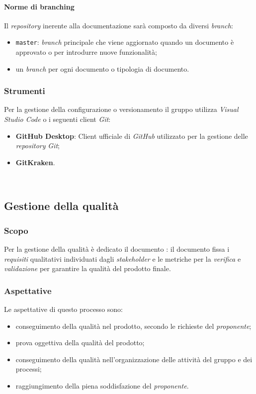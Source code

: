 		\paragraph{Norme di branching}
		\aCapo{}  
			Il \emph{repository} inerente alla documentazione sarà composto da diversi \textit{branch}:
			\begin{itemize}
				\item \verb#master#: \emph{branch} principale che viene aggiornato quando un documento è approvato o per introdurre nuove funzionalità; 
				\item un \textit{branch} per ogni documento o tipologia di documento.
			\end{itemize}
		
		\subsubsection{Strumenti}
			Per la gestione della configurazione o versionamento il gruppo utilizza \emph{Visual Studio Code} o i seguenti client \emph{Git}:
				
				\begin{itemize}
					\item \textbf{GitHub Desktop}: Client ufficiale di \emph{GitHub} utilizzato per la gestione delle \emph{repository} \emph{Git};
					\item \textbf{GitKraken}.
				\end{itemize}\
		
		\subsection{Gestione della qualità}
			\subsubsection{Scopo}
				Per la gestione della qualità è dedicato il documento \PdQ{}: il documento fissa i \emph{requisiti} qualitativi individuati dagli \emph{stakeholder} e le metriche per la \emph{verifica} e \emph{validazione} per garantire la qualità del prodotto finale.
		
			\subsubsection{Aspettative}
				 Le aspettative di questo processo sono:
					\begin{itemize}
						\item conseguimento della qualità nel prodotto, secondo le richieste del \emph{proponente};
						\item prova oggettiva della qualità del prodotto;						
						\item conseguimento della qualità nell'organizzazione delle attività del gruppo e dei processi;
						\item raggiungimento della piena soddisfazione del \emph{proponente}.
					\end{itemize}
		
